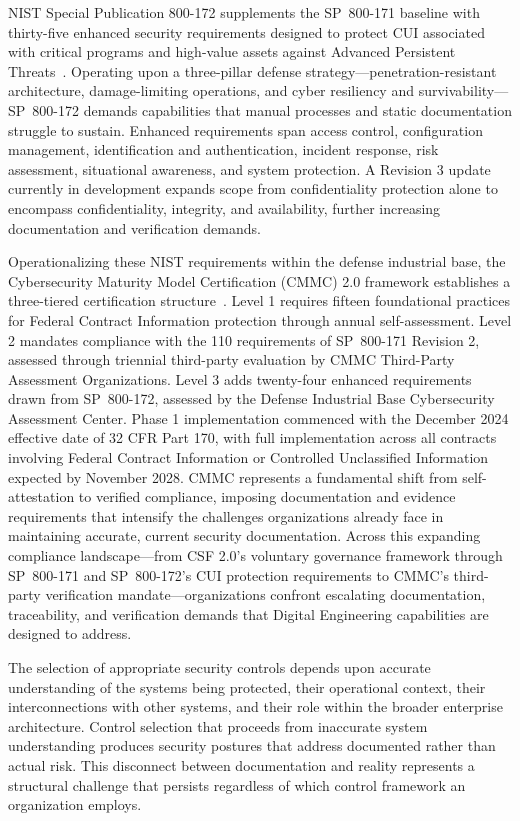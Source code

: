 NIST Special Publication 800-172 supplements the SP~800-171 baseline with thirty-five enhanced security requirements designed to protect CUI associated with critical programs and high-value assets against Advanced Persistent Threats~\parencite{NIST_SP_800_172_2021}. Operating upon a three-pillar defense strategy---penetration-resistant architecture, damage-limiting operations, and cyber resiliency and survivability---SP~800-172 demands capabilities that manual processes and static documentation struggle to sustain. Enhanced requirements span access control, configuration management, identification and authentication, incident response, risk assessment, situational awareness, and system protection. A Revision 3 update currently in development expands scope from confidentiality protection alone to encompass confidentiality, integrity, and availability, further increasing documentation and verification demands.

Operationalizing these NIST requirements within the defense industrial base, the Cybersecurity Maturity Model Certification (CMMC) 2.0 framework establishes a three-tiered certification structure~\parencite{DoD_CMMC_2024}. Level 1 requires fifteen foundational practices for Federal Contract Information protection through annual self-assessment. Level 2 mandates compliance with the 110 requirements of SP~800-171 Revision 2, assessed through triennial third-party evaluation by CMMC Third-Party Assessment Organizations. Level 3 adds twenty-four enhanced requirements drawn from SP~800-172, assessed by the Defense Industrial Base Cybersecurity Assessment Center. Phase 1 implementation commenced with the December 2024 effective date of 32 CFR Part 170, with full implementation across all contracts involving Federal Contract Information or Controlled Unclassified Information expected by November 2028. CMMC represents a fundamental shift from self-attestation to verified compliance, imposing documentation and evidence requirements that intensify the challenges organizations already face in maintaining accurate, current security documentation. Across this expanding compliance landscape---from CSF 2.0's voluntary governance framework through SP~800-171 and SP~800-172's CUI protection requirements to CMMC's third-party verification mandate---organizations confront escalating documentation, traceability, and verification demands that Digital Engineering capabilities are designed to address.

The selection of appropriate security controls depends upon accurate understanding of the systems being protected, their operational context, their interconnections with other systems, and their role within the broader enterprise architecture. Control selection that proceeds from inaccurate system understanding produces security postures that address documented rather than actual risk. This disconnect between documentation and reality represents a structural challenge that persists regardless of which control framework an organization employs.

